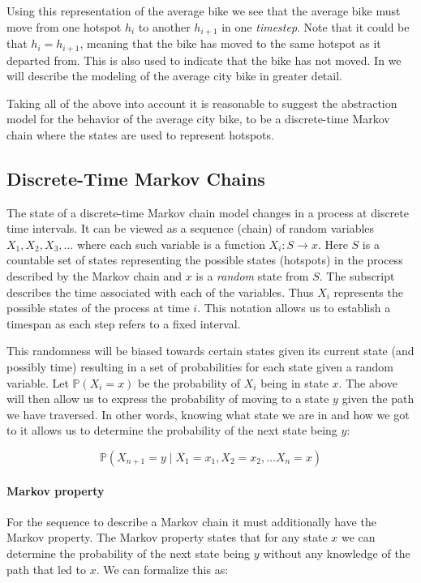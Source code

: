 Using this representation of the average bike we see that the average bike must move from one hotspot $h_i$ to another $h_{i+1}$ in one \emph{timestep}.
Note that it could be that $h_i = h_{i+1}$, meaning that the bike has moved to the same hotspot as it departed from.
This is also used to indicate that the bike has not moved.
In  we will describe the modeling of the average city bike in greater detail.

Taking all of the above into account it is reasonable to suggest the abstraction model for the behavior of the average city bike, to be a discrete-time Markov chain where the states are used to represent hotspots.

\subsection{Discrete-Time Markov Chains}\label{markov}
The state of a discrete-time Markov chain model changes in a process at discrete time intervals.
It can be viewed as a sequence (chain) of random variables $X_1, X_2, X_3, \dots$ where each such variable is a function $X_i:S \rightarrow x$.
Here $S$ is a countable set of states representing the possible states (hotspots) in the process described by the Markov chain and $x$ is a \textit{random} state from $S$.
The subscript describes the time associated with each of the variables.
Thus $X_i$ represents the possible states of the process at time $i$.
This notation allows us to establish a timespan as each step refers to a fixed interval.

This randomness will be biased towards certain states given its current state (and possibly time) resulting in a set of probabilities for each state given a random variable.
Let $\mathbb{P}(X_i = x)$ be the probability of $X_i$ being in state $x$.
The above will then allow us to express the probability of moving to a state $y$ given the path we have traversed.
In other words, knowing what state we are in and how we got to it allows us to determine the probability of the next state being $y$:

$$\mathbb{P}(X_{n+1} = y \mid X_1 = x_1, X_2 = x_2, \dots X_n = x)$$

\paragraph{Markov property}\label{markov:property}
For the sequence to describe a Markov chain it must additionally have the Markov property.
The Markov property states that for any state $x$ we can determine the probability of the next state being $y$ without any knowledge of the path that led to $x$.
We can formalize this as:


